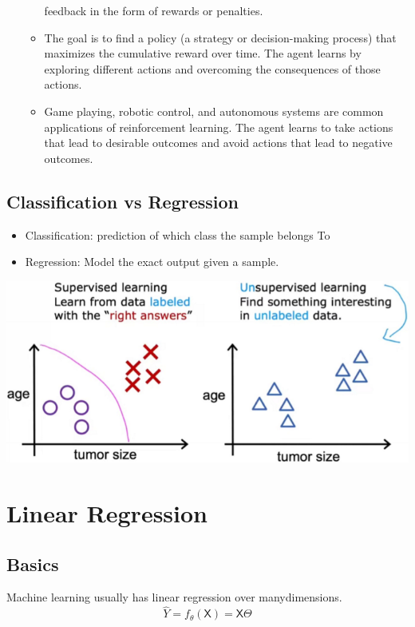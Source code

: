 \documentclass[letterpaper,12pt]{article}
\begin{document}
\begin{itemize}
\begin{itemize}
                    feedback in the form of rewards or penalties.
              \item The goal is to find a policy (a strategy or decision-making process) that
                    maximizes the cumulative reward over time. The agent learns by exploring
                    different actions and overcoming the consequences of those actions.
              \item Game playing, robotic control, and autonomous systems are common applications
                    of reinforcement learning. The agent learns to take actions that lead to
                    desirable outcomes and avoid actions that lead to negative outcomes.
          \end{itemize}
\end{itemize}

\subsection{Classification vs Regression}
\begin{itemize}
    \item Classification: prediction of which class the sample belongs To
    \item Regression: Model the exact output given a sample.
\end{itemize}

\includegraphics{./Image/Supervised vs Unsupervised.png}

\section{Linear Regression}
\subsection{Basics}
Machine learning usually has linear regression over many\-dimensions.
\[
    \hat{Y} = f_\theta(\mathsf{X})=\mathsf{X}\Theta
\]
\end{document}
